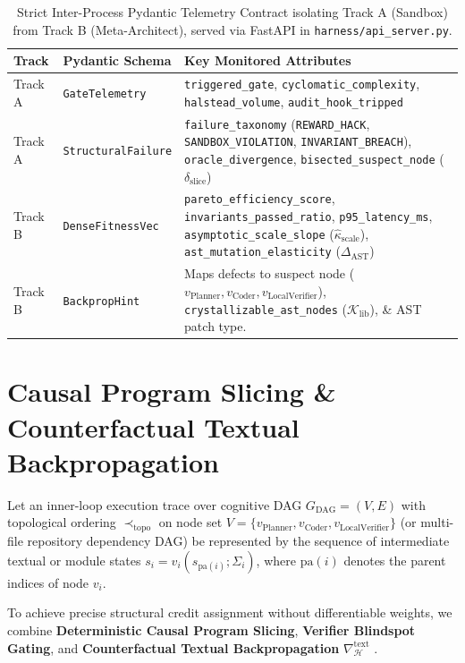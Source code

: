 \documentclass[10pt,twocolumn,letterpaper]{article}
\begin{document}
\begin{table}[htbp]
\centering
\footnotesize
\setlength{\tabcolsep}{3.5pt}
\begin{tabular}{@{}llp{}@{}}
\toprule
\textbf{Track} & \textbf{Pydantic Schema} & \textbf{Key Monitored Attributes} \\
\midrule
Track A & \texttt{GateTelemetry} & \texttt{triggered\_gate}, \texttt{cyclomatic\_\allowbreak complexity}, \texttt{halstead\_volume}, \texttt{audit\_hook\_tripped} \\[3pt]
Track A & \texttt{StructuralFailure} & \texttt{failure\_taxonomy} (\texttt{REWARD\_HACK}, \texttt{SANDBOX\_\allowbreak VIOLATION}, \texttt{INVARIANT\_\allowbreak BREACH}), \texttt{oracle\_\allowbreak divergence}, \texttt{bisected\_\allowbreak suspect\_node} ($\delta_{\text{slice}}$) \\[3pt]
Track B & \texttt{DenseFitnessVec} & \texttt{pareto\_\allowbreak efficiency\_score}, \texttt{invariants\_\allowbreak passed\_ratio}, \texttt{p95\_latency\_ms}, \texttt{asymptotic\_\allowbreak scale\_slope} ($\hat{\kappa}_{\text{scale}}$), \texttt{ast\_mutation\_\allowbreak elasticity} ($\Delta_{\text{AST}}$) \\[3pt]
Track B & \texttt{BackpropHint} & Maps defects to suspect node ($v_{\text{Planner}}, v_{\text{Coder}}, v_{\text{LocalVerifier}}$), \texttt{crystallizable\_\allowbreak ast\_nodes} ($\mathcal{K}_{\text{lib}}$), \& AST patch type. \\
\bottomrule
\end{tabular}
\caption{Strict Inter-Process Pydantic Telemetry Contract isolating Track A (Sandbox) from Track B (Meta-Architect), served via FastAPI in \texttt{harness/api\_server.py}.}
\label{tab:telemetry_contract}
\end{table}

\section{Causal Program Slicing \& Counterfactual Textual Backpropagation}
Let an inner-loop execution trace over cognitive DAG $G_{\text{DAG}}=(V,E)$ with topological ordering $\prec_{\text{topo}}$ on node set $V=\{v_{\text{Planner}},v_{\text{Coder}},v_{\text{LocalVerifier}}\}$ (or multi-file repository dependency DAG) be represented by the sequence of intermediate textual or module states $s_{i}=v_{i}(s_{\text{pa}(i)};\Sigma_{i})$, where $\text{pa}(i)$ denotes the parent indices of node $v_{i}$.

To achieve precise structural credit assignment without differentiable weights, we combine \textbf{Deterministic Causal Program Slicing}, \textbf{Verifier Blindspot Gating}, and \textbf{Counterfactual Textual Backpropagation} $\nabla_{\mathcal{H}}^{\text{text}}$ \cite{yuksekgonul2024}.
\end{document}
